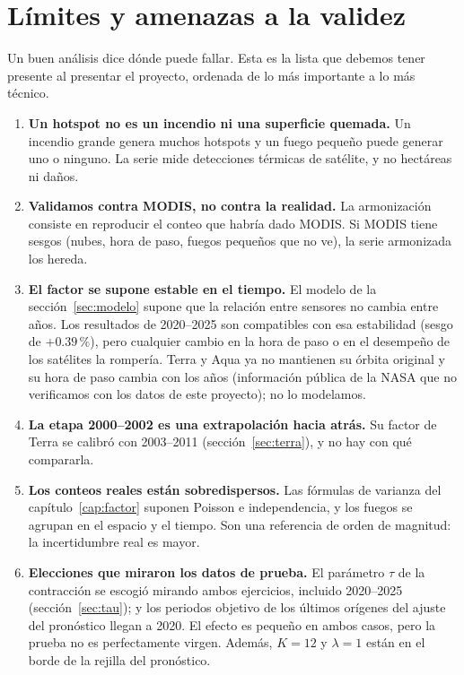 \chapter{Límites y amenazas a la validez}\label{cap:limites}

Un buen análisis dice dónde puede fallar. Esta es la lista que debemos tener presente al presentar el proyecto, ordenada de lo más importante a lo más técnico.

\begin{enumerate}[label=\arabic*.]
  \item \textbf{Un hotspot no es un incendio ni una superficie quemada.} Un incendio grande genera muchos hotspots y un fuego pequeño puede generar uno o ninguno. La serie mide detecciones térmicas de satélite, y no hectáreas ni daños.

  \item \textbf{Validamos contra MODIS, no contra la realidad.} La armonización consiste en reproducir el conteo que habría dado MODIS. Si MODIS tiene sesgos (nubes, hora de paso, fuegos pequeños que no ve), la serie armonizada los hereda.

  \item \textbf{El factor se supone estable en el tiempo.} El modelo de la sección~\ref{sec:modelo} supone que la relación entre sensores no cambia entre años. Los resultados de 2020--2025 son compatibles con esa estabilidad (sesgo de $+0.39\,\%$), pero cualquier cambio en la hora de paso o en el desempeño de los satélites la rompería. Terra y Aqua ya no mantienen su órbita original y su hora de paso cambia con los años (información pública de la NASA que no verificamos con los datos de este proyecto); no lo modelamos.

  \item \textbf{La etapa 2000--2002 es una extrapolación hacia atrás.} Su factor de Terra se calibró con 2003--2011 (sección~\ref{sec:terra}), y no hay con qué compararla.

  \item \textbf{Los conteos reales están sobredispersos.} Las fórmulas de varianza del capítulo~\ref{cap:factor} suponen Poisson e independencia, y los fuegos se agrupan en el espacio y el tiempo. Son una referencia de orden de magnitud: la incertidumbre real es mayor.

  \item \textbf{Elecciones que miraron los datos de prueba.} El parámetro $\tau$ de la contracción se escogió mirando ambos ejercicios, incluido 2020--2025 (sección~\ref{sec:tau}); y los periodos objetivo de los últimos orígenes del ajuste del pronóstico llegan a 2020. El efecto es pequeño en ambos casos, pero la prueba no es perfectamente virgen. Además, $K=12$ y $\lambda=1$ están en el borde de la rejilla del pronóstico.


\end{enumerate}
